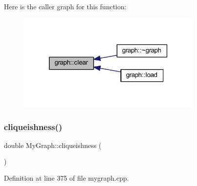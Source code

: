 Here is the caller graph for this function\+:
\nopagebreak
\begin{figure}[H]
\begin{center}
\leavevmode
\includegraphics[width=261pt]{classgraph_a9ff5d6af3653e79f87b836701453f55a_icgraph}
\end{center}
\end{figure}
\mbox{\label{class_my_graph_a2bb131d5401dc66c01acb976daa7e981}} 
\subsubsection{\texorpdfstring{cliqueishness()}{cliqueishness()}}
{\footnotesize\ttfamily double My\+Graph\+::cliqueishness (\begin{DoxyParamCaption}{ }\end{DoxyParamCaption})}



Definition at line 375 of file mygraph.\+cpp.


